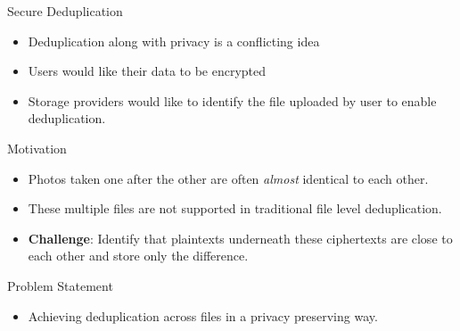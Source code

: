 \documentclass{beamer}
\begin{document}
\begin{frame}{Secure Deduplication}
\begin{itemize}
	\setlength\itemsep{1em}
	\item Deduplication along with privacy is a conflicting idea
	\item Users would like their data to be encrypted
	
	\item Storage providers would like to identify the file uploaded by user
		to enable deduplication.
\end{itemize}
\end{frame}

\begin{frame}{Motivation}
\begin{itemize}
	\setlength\itemsep{1em}
	\item Photos taken one after the other are often \textit{almost} identical to each other.
	\item These multiple files are not supported in traditional file level deduplication.
	\item \textbf{Challenge}: Identify that plaintexts underneath these ciphertexts are 
		close to each other and store only the difference.
\end{itemize}
\end{frame}

\begin{frame}{Problem Statement}
	\begin{itemize}
	\setlength\itemsep{1em}
		\item Achieving deduplication across files in a privacy preserving way.
	\end{itemize}
\end{frame}
\end{document}
